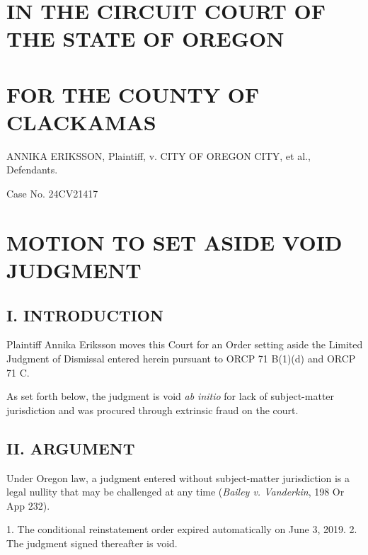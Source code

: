 \documentclass[12pt]{article}
\begin{document}
\section*{IN THE CIRCUIT COURT OF THE STATE OF OREGON}
\section*{FOR THE COUNTY OF CLACKAMAS}
\par\vspace{0.5em}
ANNIKA ERIKSSON,
    Plaintiff,
v.
CITY OF OREGON CITY, et al.,
    Defendants.
\par\vspace{0.5em}
Case No. 24CV21417
\par\vspace{0.5em}
\section*{MOTION TO SET ASIDE VOID JUDGMENT}
\par\vspace{0.5em}
\subsection*{I. INTRODUCTION}
\par\vspace{0.5em}
Plaintiff Annika Eriksson moves this Court for an Order setting aside the Limited Judgment of Dismissal entered herein pursuant to ORCP 71 B(1)(d) and ORCP 71 C. 
\par\vspace{0.5em}
As set forth below, the judgment is void \textit{ab initio} for lack of subject-matter jurisdiction and was procured through extrinsic fraud on the court.
\par\vspace{0.5em}
\subsection*{II. ARGUMENT}
\par\vspace{0.5em}
Under Oregon law, a judgment entered without subject-matter jurisdiction is a legal nullity that may be challenged at any time (\textit{Bailey v. Vanderkin}, 198 Or App 232).
\par\vspace{0.5em}
1. The conditional reinstatement order expired automatically on June 3, 2019.
2. The judgment signed thereafter is void.
\par\vspace{0.5em}
\end{document}
